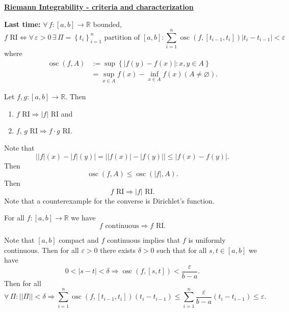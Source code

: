 \documentclass{notes}
\begin{document}
{\boldmath \bfseries \underline{Riemann Integrability - criteria and characterization}}

{\boldmath \bfseries Last time:} $\forall \, f \colon [a, b] \to \mathbb R$ bounded, 
\[
  \text{$f$ RI} \Leftrightarrow \forall \, \varepsilon > 0 \, \exists \, \Pi = \left \{ t_i \right \}_{i = 1}^n \text{ partition of $[a, b]$}: \sum_{i = 1}^n \operatorname{osc}(f, [t_{i - 1}, t_i]) \left | t_i - t_{i - 1} \right | < \varepsilon
\]
where 
\begin{align*}
  \operatorname{osc}(f, A) &:= \sup \left \{ \left | f(y) - f(x) \right | : x, y \in A \right \} \\ 
  &= \sup_{x \in A} f(x) - \inf_{x \in A} f(x) (A \neq \varnothing).
\end{align*}

\begin{lem}
  Let $f, g \colon [a, b] \to \mathbb R$.
  Then 
  \begin{enumerate}
    \item $\text{$f$ RI} \Rightarrow \text{$\left | f \right |$ RI}$ and 

    \item $\text{$f$, $g$ RI} \Rightarrow \text{$f \cdot g$ RI}$.
  \end{enumerate}
\end{lem}

\begin{prf}
  Note that 
  \[
    \left | \left | f \right |(x) - \left | f \right |(y) \right | = \left | \left | f(x) \right | - \left | f(y) \right | \right | \leq \left | f(x) - f(y) \right |.
  \]
  Then 
  \[
    \operatorname{osc}(f, A) \leq \operatorname{osc}(\left | f \right |, A).
  \]
  Then 
  \[
    \text{$f$ RI} \Rightarrow \text{$\left | f \right |$ RI}.
  \]
  Note that a counterexample for the converse is Dirichlet's function.
\end{prf}

\begin{thm}
  For all $f \colon [a, b] \to \mathbb R$ we have 
  \[
    \text{$f$ continuous} \Rightarrow \text{$f$ RI}.
  \]
\end{thm}

\begin{prf}
  Note that $[a, b]$ compact and $f$ continuous implies that $f$ is uniformly continuous.
  Then for all $\varepsilon > 0$ there exists $\delta > 0$ such that for all $s, t \in [a, b]$ we have 
  \[
    0 < \left | s - t \right | < \delta \Rightarrow \operatorname{osc}(f, [s, t]) < \frac{\varepsilon}{b - a}.
  \]
  Then for all 
  \[
    \forall \, \Pi: ||\Pi|| < \delta \Rightarrow \sum_{i = 1}^n \operatorname{osc}(f, [t_{i - 1}, t_i]) (t_i - t_{i - 1}) \leq \sum_{i = 1}^n \frac{\varepsilon}{b - a} (t_i - t_{i - 1}) \leq \varepsilon.
  \]
\end{prf}
\end{document}
